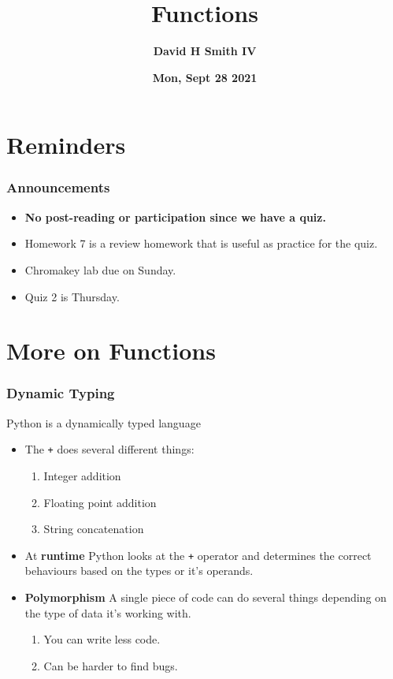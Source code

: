 \documentclass{beamer}
\title{\textbf{Functions}}
\author{\textbf{David H Smith IV}}
\institute[\textbf{UIUC}]{\textbf{University of Illinois Urbana-Champaign}}
\date{\textbf{Mon, Sept 28 2021}}
\begin{document}
\frame{\titlepage}

%
%
\section{Reminders}
\begin{frame}
  \frametitle{Announcements}
  \begin{itemize}
    \item \textbf{No post-reading or participation since we have a quiz.}
    \item Homework 7 is a review homework that is useful as practice for the quiz.
    \item Chromakey lab due on Sunday.
    \item Quiz 2 is Thursday.
  \end{itemize}
\end{frame}

\section{More on Functions}

%
%
\begin{frame}[fragile]
  \frametitle{Dynamic Typing}
  Python is a dynamically typed language
  \begin{itemize}
    \item The \lstinline|+| does several different things:
      \begin{enumerate}
        \item Integer addition
        \item Floating point addition
        \item String concatenation
      \end{enumerate}
      \pause
    \item At \textbf{runtime} Python looks at the \lstinline|+| operator and determines the correct behaviours based on the types or it's operands.
      \pause
    \item \textbf{Polymorphism} \textrightarrow A single piece of code can do several things depending on the type of data it's working with.
      \begin{enumerate}
        \item You can write less code.
        \item Can be harder to find bugs.
      \end{enumerate}

  \end{itemize}
\end{frame}
\end{document}
